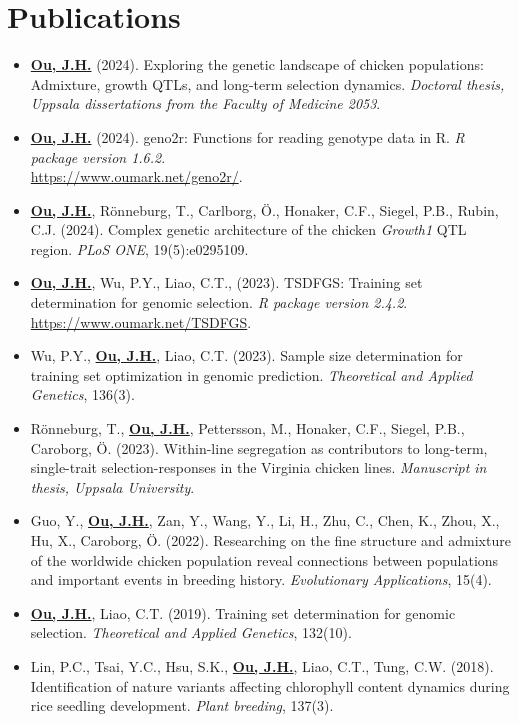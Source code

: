 \documentclass[10pt]{article}
\begin{document}
\section*{Publications}
\begin{itemize}
\item \underline{\bf Ou, J.H.} (2024). Exploring the genetic landscape of chicken populations: Admixture, growth QTLs, and long-term selection dynamics. {\it Doctoral thesis, Uppsala dissertations from the Faculty of Medicine 2053}.
\item \underline{\bf Ou, J.H.} (2024). geno2r: Functions for reading genotype data in R. {\it R package version 1.6.2}.\\ \href{https://www.oumark.net/geno2r/}{https://www.oumark.net/geno2r/}.
\item \underline{\bf Ou, J.H.}, Rönneburg, T., Carlborg, Ö., Honaker, C.F., Siegel, P.B., Rubin, C.J. (2024). Complex genetic architecture of the chicken {\it Growth1} QTL region. {\it PLoS ONE}, 19(5):e0295109.
\item \underline{\bf Ou, J.H.}, Wu, P.Y., Liao, C.T., (2023). TSDFGS: Training set determination for genomic selection. {\it R package version 2.4.2}. \href{https://www.oumark.net/TSDFGS}{https://www.oumark.net/TSDFGS}.
\item Wu, P.Y., \underline{\bf Ou, J.H.}, Liao, C.T. (2023). Sample size determination for training set optimization in genomic prediction. {\it Theoretical and Applied Genetics}, 136(3).
\item Rönneburg, T., \underline{\bf Ou, J.H.}, Pettersson, M., Honaker, C.F., Siegel, P.B., Caroborg, Ö. (2023). Within-line segregation as contributors to long-term, single-trait selection-responses in the Virginia chicken lines. {\it Manuscript in thesis, Uppsala University}.
\item Guo, Y., \underline{\bf Ou, J.H.}, Zan, Y., Wang, Y., Li, H., Zhu, C., Chen, K., Zhou, X., Hu, X., Caroborg, Ö. (2022). Researching on the fine structure and admixture of the worldwide chicken population reveal connections between populations and important events in breeding history. {\it Evolutionary Applications}, 15(4).
\item \underline{\bf Ou, J.H.}, Liao, C.T. (2019). Training set determination for genomic selection. {\it Theoretical and Applied Genetics}, 132(10).
\item Lin, P.C., Tsai, Y.C., Hsu, S.K., \underline{\bf Ou, J.H.}, Liao, C.T., Tung, C.W. (2018). Identification of nature variants affecting chlorophyll content dynamics during rice seedling development. {\it Plant breeding}, 137(3).

\end{itemize}
\end{document}
